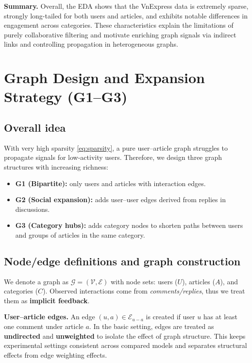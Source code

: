 \documentclass[11pt]{article}
\begin{document}
\textbf{Summary.}
Overall, the EDA shows that the VnExpress data is extremely sparse,
strongly long-tailed for both users and articles,
and exhibits notable differences in engagement across categories.
These characteristics explain the limitations of purely collaborative filtering
and motivate enriching graph signals via indirect links
and controlling propagation in heterogeneous graphs.

\section{Graph Design and Expansion Strategy (G1--G3)}
\label{sec:graph}

\subsection{Overall idea}
With very high sparsity \eqref{eq:sparsity}, a pure user--article graph struggles to propagate signals for low-activity users. Therefore, we design three graph structures with increasing richness:
\begin{itemize}
    \item \textbf{G1 (Bipartite):} only users and articles with interaction edges.
    \item \textbf{G2 (Social expansion):} adds user--user edges derived from replies in discussions.
    \item \textbf{G3 (Category hubs):} adds category nodes to shorten paths between users and groups of articles in the same category.
\end{itemize}

\subsection{Node/edge definitions and graph construction}
We denote a graph as $\mathcal{G}=(\mathcal{V},\mathcal{E})$ with node sets: users ($U$), articles ($A$), and categories ($C$). Observed interactions come from \textit{comments/replies}, thus we treat them as \textbf{implicit feedback}.

\textbf{User--article edges.} An edge $(u,a)\in \mathcal{E}_{u-a}$ is created if user $u$ has at least one comment under article $a$. In the basic setting, edges are treated as \textbf{undirected} and \textbf{unweighted} to isolate the effect of graph structure. This keeps experimental settings consistent across compared models and separates structural effects from edge weighting effects.
\end{document}
